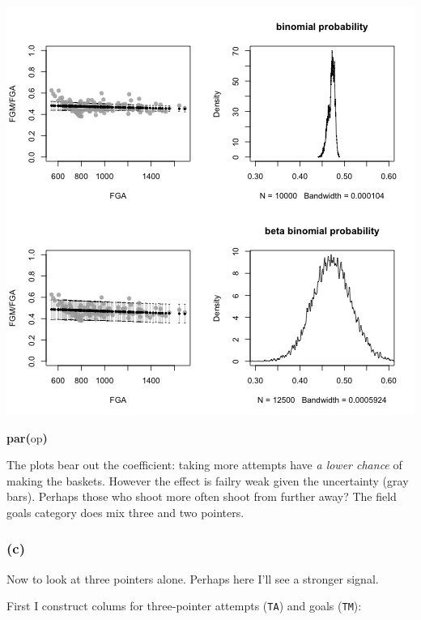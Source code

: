 \documentclass{article}
\makeatletter
\newcommand{\hlfunctioncall}[1]{\textcolor[rgb]{.5,0,.33}{\textbf{#1}}}%
\newcommand{\hlkeyword}[1]{\textbf{#1}}%
\newcommand{\hlsymbol}[1]{#1}%
\newenvironment{kframe}{%
 \def\FrameCommand##1{\hskip\@totalleftmargin \hskip-\fboxsep
 \colorbox{shadecolor}{##1}\hskip-\fboxsep
     \hskip-\linewidth \hskip-\@totalleftmargin \hskip\columnwidth}%
 \MakeFramed {\advance\hsize-\width
   \@totalleftmargin\z@ \linewidth\hsize
   \@setminipage}}%
 {\par\unskip\endMakeFramed}
\newenvironment{knitrout}{}{} %
\makeatother
\begin{document}
\begin{knitrout}
{\begin{kframe}
\includegraphics{post-bs-w-pred} \begin{flushleft}
\ttfamily\noindent
\hlfunctioncall{par}\hlkeyword{(}\hlsymbol{op}\hlkeyword{)}\mbox{}
\normalfont
\end{flushleft}
\end{kframe}}
\end{knitrout}


The plots bear out the coefficient: taking more attempts have {\em a lower chance} of making the baskets.
However the effect is failry weak given the uncertainty (gray bars). 
Perhaps those who shoot more often shoot from further away? The field goals category does mix three and two pointers. 


\subsubsection{(c)}

Now to look at three pointers alone. 
Perhaps here I'll see a stronger signal.

First I construct colums for  three-pointer attempts ({\tt TA}) and goals ({\tt TM}): 
\end{document}
